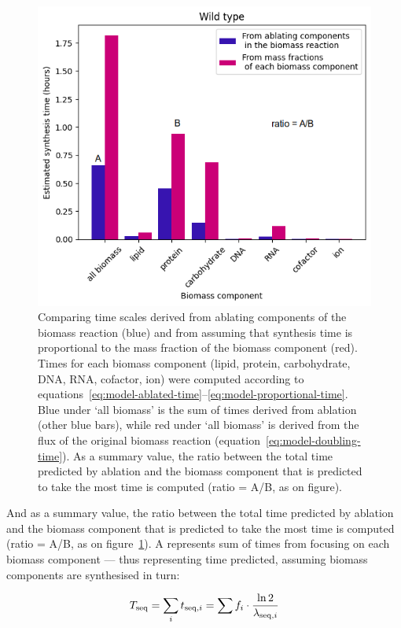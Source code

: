\begin{figure}
  \centering
  \includegraphics[width=.9\linewidth]{ablation_example_ratio.png}
  \caption{
    Comparing time scales derived from ablating components of the biomass reaction (blue) and from assuming that synthesis time is proportional to the mass fraction of the biomass component (red).
    Times for each biomass component (lipid, protein, carbohydrate, DNA, RNA, cofactor, ion) were computed according to equations~\ref{eq:model-ablated-time}--\ref{eq:model-proportional-time}.
    Blue under `all biomass' is the sum of times derived from ablation (other blue bars), while red under `all biomass' is derived from the flux of the original biomass reaction (equation~\ref{eq:model-doubling-time}).
    As a summary value, the ratio between the total time predicted by ablation and the biomass component that is predicted to take the most time is computed (ratio = A/B, as on figure).
  }
  \label{fig:model-ablate-times}
\end{figure}

And as a summary value, the ratio between the total time predicted by ablation and the biomass component that is predicted to take the most time is computed (ratio = A/B, as on figure~\ref{fig:model-ablate-times}).
A represents sum of times from focusing on each biomass component --- thus representing time predicted, assuming biomass components are synthesised in turn:

\begin{equation}
  T_{\mathrm{seq}} = \sum_{i} t_{\mathrm{seq},i} = \sum f_{i} \cdot \frac{\ln 2}{\lambda_{\mathrm{seq},i}}
  \label{eq:model-a}
\end{equation}

